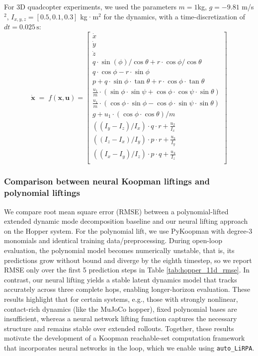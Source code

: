 \documentclass{l4dc2026}
\begin{document}
\noindent For 3D quadcopter experiments, we used the parameters $m=1$kg, $g=-9.81$ m/s$^2$, $I_{x,y,z}=[0.5,0.1,0.3]$ kg·m$^2$ for the dynamics, with a time-discretization of $dt = 0.025\,\mathrm{s}$:
\begin{equation}
    \dot{\mathbf{x}} \;=\; f(\mathbf{x},\mathbf{u})=
    \begin{bmatrix}
        \dot{x} \\
        \dot{y} \\
        \dot{z} \\
        q \cdot \sin(\phi)/\cos{\theta}+r\cdot \cos{\phi}/\cos{\theta} \\
        q \cdot \cos{\phi} - r\cdot \sin{\phi} \\
        p + q \cdot \sin{\phi}\cdot \tan{\theta} +r\cdot \cos{\phi} \cdot \tan{\theta} \\
        \frac{u_1}{m} \cdot (\sin{\phi} \cdot \sin{\psi} + \cos{\phi} \cdot \cos{\psi} \cdot \sin{\theta}) \\ 
        \frac{u_1}{m} \cdot (\cos{\phi} \cdot \sin{\phi} - \cos{\phi} \cdot \sin{\psi} \cdot \sin{\theta}) \\ 
        g + u_1 \cdot (\cos{\phi} \cdot \cos{\theta}) / m\\
        ((I_y - I_z) / I_x) \cdot q\cdot r + \frac{u_2}{I_x} \\
        ((I_z - I_x) / I_y) \cdot p\cdot r + \frac{u_3}{I_y} \\
        ((I_x - I_y) / I_z) \cdot p\cdot q + \frac{u_4}{I_z} \\
    \end{bmatrix}
    \label{eq:3D_Quad_dyn}
\end{equation}

\subsubsection{Comparison between neural Koopman liftings and polynomial liftings}\label{app:polynomial}
We compare root mean square error (RMSE) between a polynomial-lifted extended dynamic mode decomposition baseline and our neural lifting approach on the Hopper system. For the polynomial lift, we use PyKoopman \citep{pykoopman} with degree-3 monomials and identical training data/preprocessing. During open-loop evaluation, the polynomial model becomes numerically unstable, that is, its predictions grow without bound and diverge by the eighth timestep, so we report RMSE only over the first 5 prediction steps in Table \ref{tab:hopper_11d_rmse}. In contrast, our neural lifting yields a stable latent dynamics model that tracks accurately across three complete hops, enabling longer-horizon evaluation. These results highlight that for certain systems, e.g., those with strongly nonlinear, contact-rich dynamics (like the MuJoCo hopper), fixed polynomial bases are insufficient, whereas a neural network lifting function captures the necessary structure and remains stable over extended rollouts. Together, these results motivate the development of a Koopman reachable-set computation framework that incorporates neural networks in the loop, which we enable using \texttt{auto\_LiRPA}.
\end{document}
